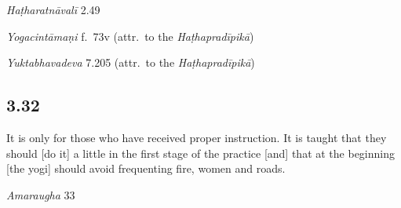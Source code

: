 \begin{ekdosis}
\begin{testimonia}[hp03_031]
\emph{Haṭharatnāvalī} 2.49
\begin{versinnote}
\end{versinnote}

\emph{Yogacintāmaṇi} f.~73v (attr.~to the \emph{Haṭhapradīpikā})
\begin{versinnote}
\end{versinnote}

\emph{Yuktabhavadeva} 7.205 (attr.~to the \emph{Haṭhapradīpikā})
\begin{versinnote}
\end{versinnote}
\end{testimonia}


\subsection*{3.32}
\begin{translation}[hp03_032]
It is only for those who have received proper instruction. It is taught that they should [do it] a little in the first stage of the practice [and] that at the beginning [the yogi] should avoid frequenting fire, women and roads.
\end{translation}

\begin{sources}[hp03_032]
\emph{Amaraugha} 33
\begin{versinnote}
\end{versinnote}
\end{sources}


\end{ekdosis}
